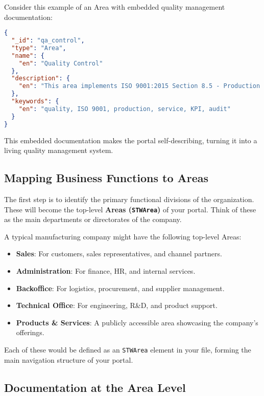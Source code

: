 Consider this example of an Area with embedded quality management documentation:

\begin{lstlisting}[language=JSON,caption={Area with Quality Management Documentation},label={lst:quality-area}]
{
  "_id": "qa_control",
  "type": "Area",
  "name": {
    "en": "Quality Control"
  },
  "description": {
    "en": "This area implements ISO 9001:2015 Section 8.5 - Production and Service Provision. All processes documented here follow our Quality Manual QM-2024-Rev3. Key Performance Indicators: Defect Rate < 0.1%, Customer Satisfaction > 95%."
  },
  "keywords": {
    "en": "quality, ISO 9001, production, service, KPI, audit"
  }
}
\end{lstlisting}

This embedded documentation makes the portal self-describing, turning it into a living quality management system.

\subsection{Mapping Business Functions to Areas}

The first step is to identify the primary functional divisions of the organization. These will become the top-level \textbf{Areas (\texttt{STWArea})} of your portal. Think of these as the main departments or directorates of the company.

A typical manufacturing company might have the following top-level Areas:
\begin{itemize}
    \item \textbf{Sales}: For customers, sales representatives, and channel partners.
    \item \textbf{Administration}: For finance, HR, and internal services.
    \item \textbf{Backoffice}: For logistics, procurement, and supplier management.
    \item \textbf{Technical Office}: For engineering, R\&D, and product support.
    \item \textbf{Products \& Services}: A publicly accessible area showcasing the company's offerings.
\end{itemize}

Each of these would be defined as an \texttt{STWArea} element in your \wbdl{} file, forming the main navigation structure of your portal.

\subsection{Documentation at the Area Level}
\label{sec:area-documentation}

